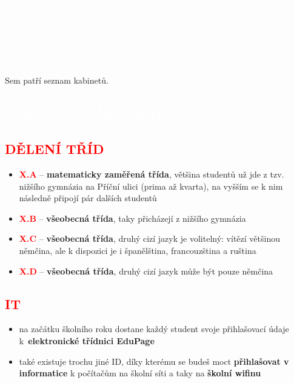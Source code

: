 \documentclass{article}
\newcommand{\nadpis}[1]{
  \vspace*{-60pt}
  \begin{nadpisbox}
    \vspace*{20pt}
    \centering \section*{\textcolor{white}{#1}}
  \end{nadpisbox}
}
\newcommand{\podnadpis}[1]{
  \subsection*{\textcolor{red}{#1}}
}
\begin{document}
\begin{titlepage}
  \pagecolor{red}
    \begin{center}
      \vspace*{\fill}

      \textcolor{white}{\fontsize{60}{60} \Kapitan Průvodce\\\vspace{0.2em}prváka}

      \vspace*{\fill}
      \textcolor{white}{\fontsize{20}{20} \Kapitan Jaroška}

      \vspace{0.5em}

      \begin{bluebox}
        \centering \fontsize{15}{15} \Kapitan \textcolor{white}{2024/2025}
      \end{bluebox}

      \vspace{3em}

    \end{center}
\end{titlepage}
\pagecolor{white}



\newpage

Sem patří seznam kabinetů.
\newpage

\nadpis{JAK TO U NÁS CHODÍ}
\noindent \podnadpis{DĚLENÍ TŘÍD}
\begin{itemize}[leftmargin=10pt]
  \item \textcolor{red}{\textbf{X.A}} --  \textbf{matematicky zaměřená třída}, většina studentů už jde z tzv. nižšího gymnázia na Příční ulici (prima až kvarta), na vyšším se k nim následně připojí pár dalších studentů
  \item \textcolor{red}{\textbf{X.B}} -- \textbf{všeobecná třída}, taky přicházejí z nižšího gymnázia
  \item \textcolor{red}{\textbf{X.C}} -- \textbf{všeobecná třída}, druhý cizí jazyk je volitelný: vítězí většinou němčina, ale
k dispozici je i španělština, francouzština a ruština
  \item \textcolor{red}{\textbf{X.D}} -- \textbf{všeobecná třída}, druhý cizí jazyk může být pouze němčina
\end{itemize}
\podnadpis{IT}
\begin{itemize}[leftmargin=10pt]
  \item na začátku školního roku dostane každý student svoje přihlašovací údaje k~\textbf{elektronické třídnici EduPage}
  \item také existuje trochu jiné ID, díky kterému se budeš moct \textbf{přihlašovat v informatice} k počítačům na školní síti a taky na \textbf{školní wifinu}
\end{itemize}
\end{document}
